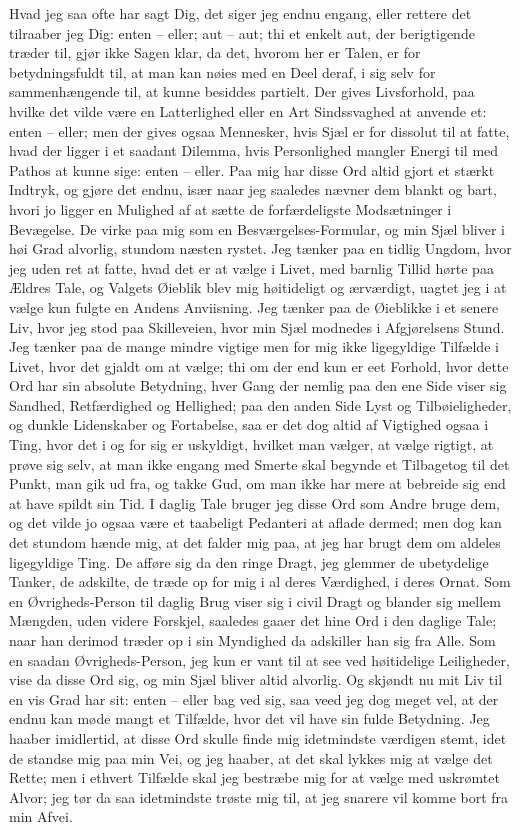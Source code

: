 \documentclass[12pt,a4paper]{article}
\begin{document}
Hvad jeg saa ofte har sagt Dig, det siger jeg endnu engang, eller rettere det tilraaber jeg Dig: enten – eller; aut – aut; thi et enkelt aut, der berigtigende træder til, gjør ikke Sagen klar, da det, hvorom her er Talen, er for betydningsfuldt til, at man kan nøies med en Deel deraf, i sig selv for sammenhængende til, at kunne besiddes partielt. Der gives Livsforhold, paa hvilke det vilde være en Latterlighed eller en Art Sindssvaghed at anvende et: enten – eller; men der gives ogsaa Mennesker, hvis Sjæl er for dissolut til at fatte, hvad der ligger i et saadant Dilemma, hvis Personlighed mangler Energi til med Pathos at kunne sige: enten – eller. Paa mig har disse Ord altid gjort et stærkt Indtryk, og gjøre det endnu, især naar jeg saaledes nævner dem blankt og bart, hvori jo ligger en Mulighed af at sætte de forfærdeligste Modsætninger i Bevægelse. De virke paa mig som en Besværgelses-Formular, og min Sjæl bliver i høi Grad alvorlig, stundom næsten rystet. Jeg tænker paa en tidlig Ungdom, hvor jeg uden ret at fatte, hvad det er at vælge i Livet, med barnlig Tillid hørte paa Ældres Tale, og Valgets Øieblik blev mig høitideligt og ærværdigt, uagtet jeg i at vælge kun fulgte en Andens Anviisning. Jeg tænker paa de Øieblikke i et senere Liv, hvor jeg stod paa Skilleveien, hvor min Sjæl modnedes i Afgjørelsens Stund. Jeg tænker paa de mange mindre vigtige men for mig ikke ligegyldige Tilfælde i Livet, hvor det gjaldt om at vælge; thi om der end kun er eet Forhold, hvor dette Ord har sin absolute Betydning, hver Gang der nemlig paa den ene Side viser sig Sandhed, Retfærdighed og Hellighed; paa den anden Side Lyst og Tilbøieligheder, og dunkle Lidenskaber og Fortabelse, saa er det dog altid af Vigtighed ogsaa i Ting, hvor det i og for sig er uskyldigt, hvilket man vælger, at vælge rigtigt, at prøve sig selv, at man ikke engang med Smerte skal begynde et Tilbagetog til det Punkt, man gik ud fra, og takke Gud, om man ikke har mere at bebreide sig end at have spildt sin Tid. I daglig Tale bruger jeg disse Ord som Andre bruge dem, og det vilde jo ogsaa være et taabeligt Pedanteri at aflade dermed; men dog kan det stundom hænde mig, at det falder mig paa, at jeg har brugt dem om aldeles ligegyldige Ting. De afføre sig da den ringe Dragt, jeg glemmer de ubetydelige Tanker, de adskilte, de træde op for mig i al deres Værdighed, i deres Ornat. Som en Øvrigheds-Person til daglig Brug viser sig i civil Dragt og blander sig mellem Mængden, uden videre Forskjel, saaledes gaaer det hine Ord i den daglige Tale; naar han derimod træder op i sin Myndighed da adskiller han sig fra Alle. Som en saadan Øvrigheds-Person, jeg kun er vant til at see ved høitidelige Leiligheder, vise da disse Ord sig, og min Sjæl bliver altid alvorlig. Og skjøndt nu mit Liv til en vis Grad har sit: enten – eller bag ved sig, saa veed jeg dog meget vel, at der endnu kan møde mangt et Tilfælde, hvor det vil have sin fulde Betydning. Jeg haaber imidlertid, at disse Ord skulle finde mig idetmindste værdigen stemt, idet de standse mig paa min Vei, og jeg haaber, at det skal lykkes mig at vælge det Rette; men i ethvert Tilfælde skal jeg bestræbe mig for at vælge med uskrømtet Alvor; jeg tør da saa idetmindste trøste mig til, at jeg snarere vil komme bort fra min Afvei.
\end{document}
